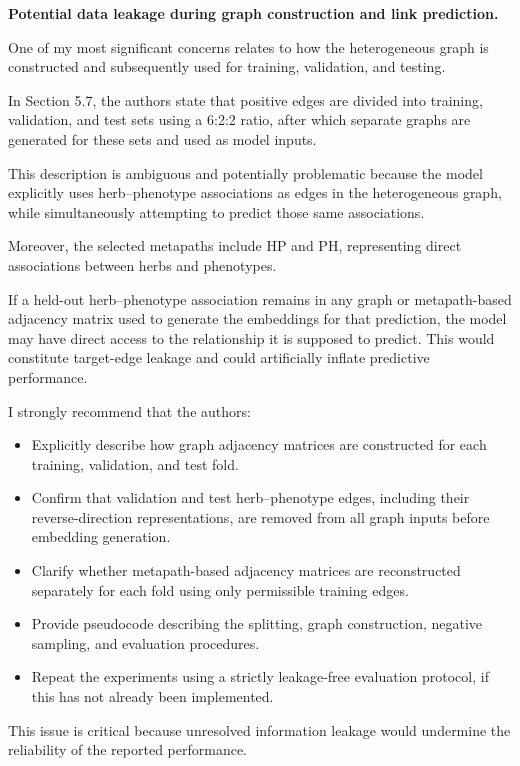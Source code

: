 \documentclass[11pt,american]{article}
\begin{document}
\begin{revcomment}
\textbf{Potential data leakage during graph construction and link prediction.}

One of my most significant concerns relates to how the heterogeneous graph is constructed and subsequently used for training, validation, and testing.

In Section 5.7, the authors state that positive edges are divided into training, validation, and test sets using a 6:2:2 ratio, after which separate graphs are generated for these sets and used as model inputs.

This description is ambiguous and potentially problematic because the model explicitly uses herb--phenotype associations as edges in the heterogeneous graph, while simultaneously attempting to predict those same associations.

Moreover, the selected metapaths include HP and PH, representing direct associations between herbs and phenotypes.

If a held-out herb--phenotype association remains in any graph or metapath-based adjacency matrix used to generate the embeddings for that prediction, the model may have direct access to the relationship it is supposed to predict. This would constitute target-edge leakage and could artificially inflate predictive performance.

I strongly recommend that the authors:
\begin{itemize}
\item Explicitly describe how graph adjacency matrices are constructed for each training, validation, and test fold.
\item Confirm that validation and test herb--phenotype edges, including their reverse-direction representations, are removed from all graph inputs before embedding generation.
\item Clarify whether metapath-based adjacency matrices are reconstructed separately for each fold using only permissible training edges.
\item Provide pseudocode describing the splitting, graph construction, negative sampling, and evaluation procedures.
\item Repeat the experiments using a strictly leakage-free evaluation protocol, if this has not already been implemented.
\end{itemize}

This issue is critical because unresolved information leakage would undermine the reliability of the reported performance.
\end{revcomment}
\end{document}
